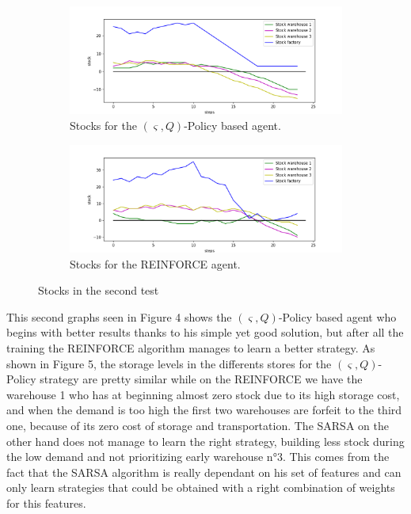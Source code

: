 \documentclass[journal, a4paper]{IEEEtran}
\theoremstyle{plain}
\theoremstyle{definition}
\begin{document}
\begin{figure}
	\raggedleft
	\begin{subfigure}[b]{0.24\textwidth}
		\includegraphics[width=1.2\columnwidth]{reinforce_stocks.png}
		\caption{Stocks for the $(\varsigma, Q)$-Policy based agent.}
		\label{reinforce_stocks}
	\end{subfigure}
	\begin{subfigure}[b]{0.24\textwidth}
		\includegraphics[width=1.2\columnwidth]{s_q_stocks.png}
		\caption{ Stocks for the REINFORCE agent.}
		\label{s_q_stocks}
	\end{subfigure}
	\caption{Stocks in the second test}\label{fig:animals}
	 \vspace{-20pt}
\end{figure}
This second graphs seen in Figure 4 shows the $(\varsigma, Q)$-Policy based agent who begins with better results thanks to his simple yet good solution, but after all the training the REINFORCE algorithm manages to learn a better strategy. As shown in Figure 5, the storage levels in the differents stores for the $(\varsigma, Q)$-Policy strategy are pretty similar while on the REINFORCE we have the warehouse 1 who has at beginning almost zero stock due to its high storage cost, and when the demand is too high the first two warehouses are forfeit to the third one, because of its zero cost of storage and transportation. \newline
The SARSA on the other hand does not manage to learn the right strategy, building less stock during the low demand and not prioritizing early warehouse n°3. This comes from the fact that the SARSA algorithm is really dependant on his set of features and can only learn strategies that could be obtained with a right combination of weights for this features.
\end{document}
